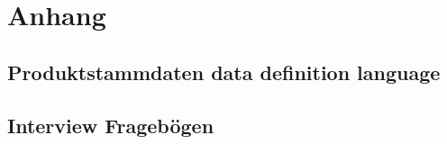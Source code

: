 \UseRawInputEncoding

\chapter{Anhang}\label{app:Anhang}

\section{Produktstammdaten data definition language}\label{app:ddl}


\section{Interview Fragebögen}\label{app:fragen}
